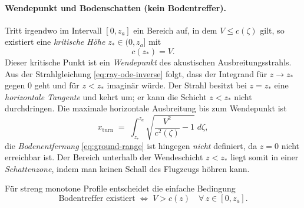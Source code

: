\paragraph{Wendepunkt und Bodenschatten (kein Bodentreffer).}
Tritt irgendwo im Intervall $[0,z_a]$ ein Bereich auf, in dem
$V\le c(\zeta)$ gilt, so existiert eine
\emph{kritische Höhe} $z_\ast\in(0,z_a]$ mit
\begin{equation}
    c(z_\ast)=V.
    \label{eq:turning-def}
\end{equation}
Dieser kritische Punkt ist ein \emph{Wendepunkt} des akustischen Ausbreitungsstrahls.
Aus der Strahlgleichung \eqref{eq:ray-ode-inverse} folgt, dass der
Integrand für $z\to z_\ast$ gegen $0$ geht und für $z<z_\ast$ imaginär würde.
Der Strahl besitzt bei $z=z_\ast$ eine \emph{horizontale Tangente} und kehrt um;
er kann die Schicht $z<z_\ast$ nicht durchdringen.
Die maximale horizontale Ausbreitung bis zum Wendepunkt ist
\begin{equation}
    x_{\mathrm{turn}}
    \;=\; \int_{z_\ast}^{z_a} \sqrt{\frac{V^2}{c^2(\zeta)}-1}\;d\zeta,
    \label{eq:x-turn}
\end{equation}
die \emph{Bodenentfernung} \eqref{eq:ground-range} ist hingegen \emph{nicht}
definiert, da $z=0$ nicht erreichbar ist.
Der Bereich unterhalb der Wendeschicht $z<z_\ast$ liegt somit in einer
\emph{Schattenzone}, indem man keinen Schall des Flugzeugs höhren kann.

Für streng monotone Profile entscheidet die einfache Bedingung
\begin{equation}
    \text{Bodentreffer existiert} \;\Leftrightarrow\; V>c(z)\quad\forall\,z\in[0,z_a].
    \label{eq:ground-hit-condition}
\end{equation}

